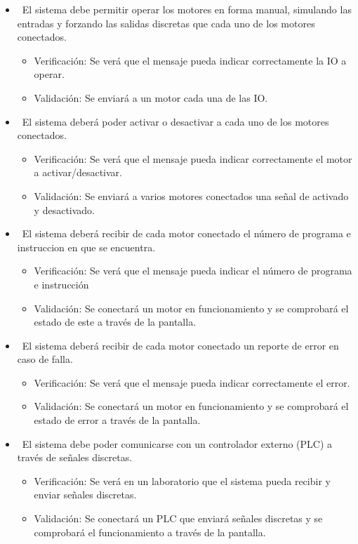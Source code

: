 \documentclass[
11pt, %
]{charter}
\begin{document}
\begin{itemize}
\begin{itemize}
	\end{itemize}
	\item \REQ ~El sistema debe permitir operar los motores en forma manual, simulando las entradas y forzando las salidas discretas que cada uno de los motores conectados.
	\begin{itemize}
		\item Verificación: Se verá que el mensaje pueda indicar correctamente la IO a operar.
		\item Validación: Se enviará a un motor cada una de las IO.
	\end{itemize}
	\item \REQ ~El sistema deberá poder activar o desactivar a cada uno de los motores conectados.
	\begin{itemize}
		\item Verificación: Se verá que el mensaje pueda indicar correctamente el motor a activar/desactivar.
		\item Validación: Se enviará a varios motores conectados una señal de activado y desactivado.
	\end{itemize}
	\item \REQ ~El sistema deberá recibir de cada motor conectado el número de programa e instruccion en que se encuentra.
	\begin{itemize}
		\item Verificación: Se verá que el mensaje pueda indicar el número de programa e instrucción
		\item Validación: Se conectará un motor en funcionamiento y se comprobará el estado de este a través de la pantalla.
	\end{itemize}
	\item \REQ ~El sistema deberá recibir de cada motor conectado un reporte de error en caso de falla.
	\begin{itemize}
		\item Verificación: Se verá que el mensaje pueda indicar correctamente el error.
		\item Validación: Se conectará un motor en funcionamiento y se comprobará el estado de error a través de la pantalla.
	\end{itemize}
	\item \REQ ~El sistema debe poder comunicarse con un controlador externo (PLC) a través de señales discretas.
	\begin{itemize}
		\item Verificación: Se verá en un laboratorio que el sistema pueda recibir y enviar señales discretas.
		\item Validación: Se conectará un PLC que enviará señales discretas y se comprobará el funcionamiento a través de la pantalla.

\end{itemize}
\end{itemize}
\end{document}
